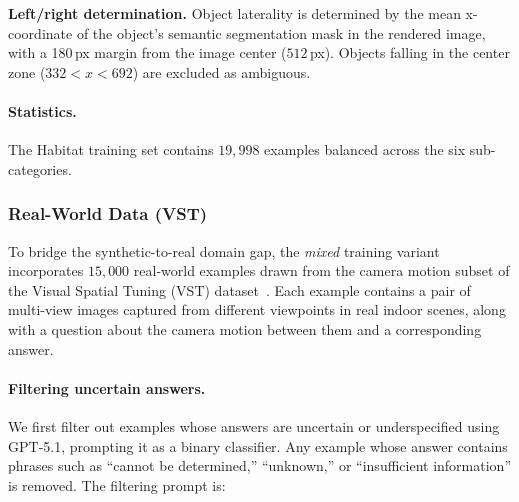 \noindent\textbf{Left/right determination.}
Object laterality is determined by the mean x-coordinate of the object's semantic segmentation mask in the rendered image, with a 180\,px margin from the image center ($512$\,px).
Objects falling in the center zone ($332 < x < 692$) are excluded as ambiguous.

\paragraph{Statistics.}
The Habitat training set contains $19{,}998$ examples balanced across the six sub-categories.


\subsubsection{Real-World Data (VST)}


To bridge the synthetic-to-real domain gap, the \emph{mixed} training variant incorporates $15{,}000$ real-world examples drawn from the camera motion subset of the Visual Spatial Tuning (VST) dataset~\cite{yang2025visual}. Each example contains a pair of multi-view images captured from different viewpoints in real indoor scenes, along with a question about the camera motion between them and a corresponding answer.
 
\paragraph{Filtering uncertain answers.}
We first filter out examples whose answers are uncertain or underspecified using GPT-5.1, prompting it as a binary classifier. Any example whose answer contains phrases such as ``cannot be determined,'' ``unknown,'' or ``insufficient information'' is removed. The filtering prompt is:
 
